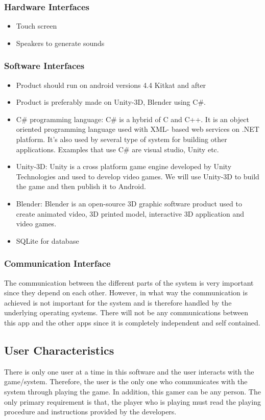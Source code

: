 \documentclass[a4paper,11pt]{article}
\begin{document}
\subsubsection{Hardware Interfaces}
\begin{itemize}
\item Touch screen
\item Speakers to generate sounds
\end{itemize}
\subsubsection{Software Interfaces}
\begin{itemize}
\item Product should run on android versions 4.4 Kitkat and after
\item Product is preferably made on Unity-3D, Blender using C\#.
\item C\# programming language: C\# is a hybrid of C and C++. It is an object oriented programming language used with XML- based web services on .NET platform. It's also used by several type of system for building other applications. Examples that use C\# are visual studio, Unity etc.
\item Unity-3D: Unity is a cross platform game engine developed by Unity Technologies and used to develop video games. We will use Unity-3D to build the game and then publish it to Android.
\item Blender: Blender is an open-source 3D graphic software product used to create animated video, 3D printed model, interactive 3D application and video games. 
\item SQLite for database
\end{itemize}
\subsubsection{Communication Interface}
The communication between the different parts of the system is very important since they depend on each other. However, in what way the communication is achieved is not important for the system and is therefore handled by the underlying operating systems. There will not be any communications between this app and the other apps since it is completely independent and self contained.

\subsection{User Characteristics}
There is only one user at a time in this software and the user interacts with the game/system. 
	Therefore, the user is the only one who communicates with the system through playing the game. In addition, this gamer can be any person. The only primary requirement is that, the player who is playing must read the playing procedure and instructions provided by the developers.
\end{document}
